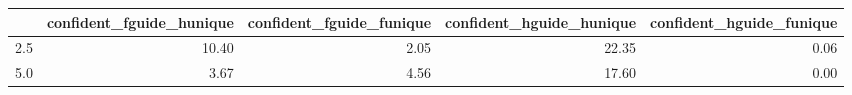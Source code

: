 \begin{tabular}{lrrrr}
\toprule
 & confident_fguide_hunique & confident_fguide_funique & confident_hguide_hunique & confident_hguide_funique \\
\midrule
2.5 & 10.40 & 2.05 & 22.35 & 0.06 \\
5.0 & 3.67 & 4.56 & 17.60 & 0.00 \\
\bottomrule
\end{tabular}

